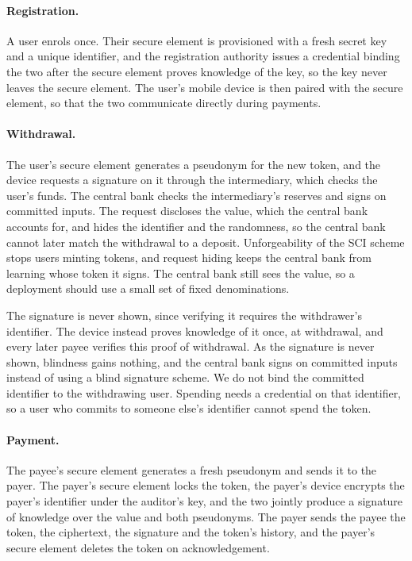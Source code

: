 \paragraph{Registration.} A user enrols once. Their secure element is
provisioned with a fresh secret key and a unique identifier, and the
registration authority issues a credential binding the two after the secure
element proves knowledge of the key, so the key never leaves the secure
element. The user's mobile device is then paired with the secure element, so
that the two communicate directly during payments.

\paragraph{Withdrawal.} The user's secure element generates a pseudonym for the
new token, and the device requests a signature on it through the intermediary,
which checks the user's funds. The central bank checks the intermediary's
reserves and signs on committed inputs. The request discloses the value, which
the central bank accounts for, and hides the identifier and the randomness, so
the central bank cannot later match the withdrawal to a deposit. Unforgeability
of the SCI scheme stops users minting tokens, and request hiding keeps the
central bank from learning whose token it signs. The central bank still sees
the value, so a deployment should use a small set of fixed denominations.

The signature is never shown, since verifying it requires the withdrawer's
identifier. The device instead proves knowledge of it once, at withdrawal, and
every later payee verifies this proof of withdrawal. As the signature is
never shown, blindness gains nothing, and the central bank signs on committed
inputs instead of using a blind signature scheme. We do not bind the committed
identifier to the withdrawing user. Spending needs a credential on that
identifier, so a user who commits to someone else's identifier cannot spend the
token.

\paragraph{Payment.} The payee's secure element generates a fresh pseudonym and
sends it to the payer. The payer's secure element locks the token, the payer's
device encrypts the payer's identifier under the auditor's key, and the two
jointly produce a signature of knowledge over the value and both pseudonyms.
The payer sends the payee the token, the ciphertext, the signature and the
token's history, and the payer's secure element deletes the token on
acknowledgement.

